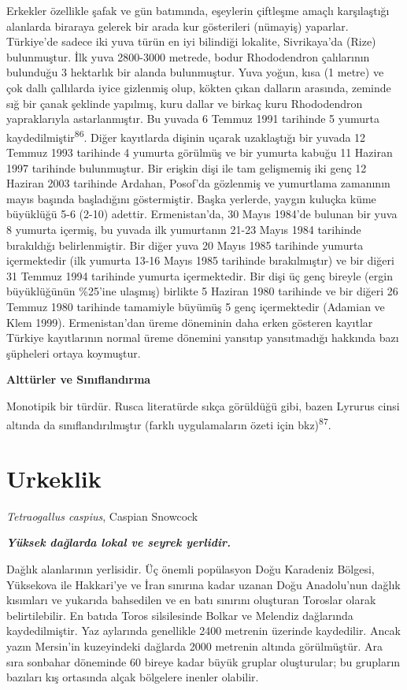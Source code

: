 \documentclass[
  letterpaper,
  DIV=11,
  numbers=noendperiod]{scrreprt}
\begin{document}
Erkekler özellikle şafak ve gün batımında, eşeylerin çiftleşme amaçlı
karşılaştığı alanlarda biraraya gelerek bir arada kur gösterileri
(nümayiş) yaparlar. Türkiye'de sadece iki yuva türün en iyi bilindiği
lokalite, Sivrikaya'da (Rize) bulunmuştur. İlk yuva 2800-3000 metrede,
bodur Rhododendron çalılarının bulunduğu 3 hektarlık bir alanda
bulunmuştur. Yuva yoğun, kısa (1 metre) ve çok dallı çallılarda iyice
gizlenmiş olup, kökten çıkan dalların arasında, zeminde sığ bir çanak
şeklinde yapılmış, kuru dallar ve birkaç kuru Rhododendron yapraklarıyla
astarlanmıştır. Bu yuvada 6 Temmuz 1991 tarihinde 5 yumurta
kaydedilmiştir\textsuperscript{86}. Diğer kayıtlarda dişinin uçarak
uzaklaştığı bir yuvada 12 Temmuz 1993 tarihinde 4 yumurta görülmüş ve
bir yumurta kabuğu 11 Haziran 1997 tarihinde bulunmuştur. Bir erişkin
dişi ile tam gelişmemiş iki genç 12 Haziran 2003 tarihinde Ardahan,
Posof'da gözlenmiş ve yumurtlama zamanının mayıs başında başladığını
göstermiştir. Başka yerlerde, yaygın kuluçka küme büyüklüğü 5-6 (2-10)
adettir. Ermenistan'da, 30 Mayıs 1984'de bulunan bir yuva 8 yumurta
içermiş, bu yuvada ilk yumurtanın 21-23 Mayıs 1984 tarihinde bırakıldığı
belirlenmiştir. Bir diğer yuva 20 Mayıs 1985 tarihinde yumurta
içermektedir (ilk yumurta 13-16 Mayıs 1985 tarihinde bırakılmıştır) ve
bir diğeri 31 Temmuz 1994 tarihinde yumurta içermektedir. Bir dişi üç
genç bireyle (ergin büyüklüğünün \%25'ine ulaşmış) birlikte 5 Haziran
1980 tarihinde ve bir diğeri 26 Temmuz 1980 tarihinde tamamiyle büyümüş
5 genç içermektedir (Adamian ve Klem 1999). Ermenistan'dan üreme
döneminin daha erken gösteren kayıtlar Türkiye kayıtlarının normal üreme
dönemini yansıtıp yansıtmadığı hakkında bazı şüpheleri ortaya koymuştur.

\textbf{Alttürler ve Sınıflandırma}

Monotipik bir türdür. Rusca literatürde sıkça görüldüğü gibi, bazen
Lyrurus cinsi altında da sınıflandırılmıştır (farklı uygulamaların özeti
için bkz)\textsuperscript{87}.

\hypertarget{urkeklik}{%
\section{Urkeklik}\label{urkeklik}}

\emph{Tetraogallus caspius}, Caspian Snowcock

\textbf{\emph{Yüksek dağlarda lokal ve seyrek yerlidir.}}

Dağlık alanlarının yerlisidir. Üç önemli popülasyon Doğu Karadeniz
Bölgesi, Yüksekova ile Hakkari'ye ve İran sınırına kadar uzanan Doğu
Anadolu'nun dağlık kısımları ve yukarıda bahsedilen ve en batı sınırını
oluşturan Toroslar olarak belirtilebilir. En batıda Toros silsilesinde
Bolkar ve Melendiz dağlarında kaydedilmiştir. Yaz aylarında genellikle
2400 metrenin üzerinde kaydedilir. Ancak yazın Mersin'in kuzeyindeki
dağlarda 2000 metrenin altında görülmüştür. Ara sıra sonbahar döneminde
60 bireye kadar büyük gruplar oluşturular; bu grupların bazıları kış
ortasında alçak bölgelere inenler olabilir.
\end{document}
